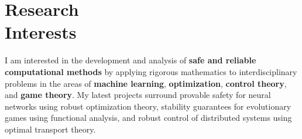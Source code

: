 \section{\texorpdfstring{Research \\[\baselineskip] Interests}{Research Interests}}
\hfill\vspace*{-2\baselineskip}

\begin{adjustwidth}{\sectionwidth}{}I am interested in the development and analysis of \textbf{safe and reliable computational methods} by applying rigorous mathematics to interdisciplinary problems in the areas of \textbf{machine learning}, \textbf{optimization}, \textbf{control theory}, and \textbf{game theory}. My latest projects surround provable safety for neural networks using robust optimization theory, stability guarantees for evolutionary games using functional analysis, and robust control of distributed systems using optimal transport theory.\end{adjustwidth}
